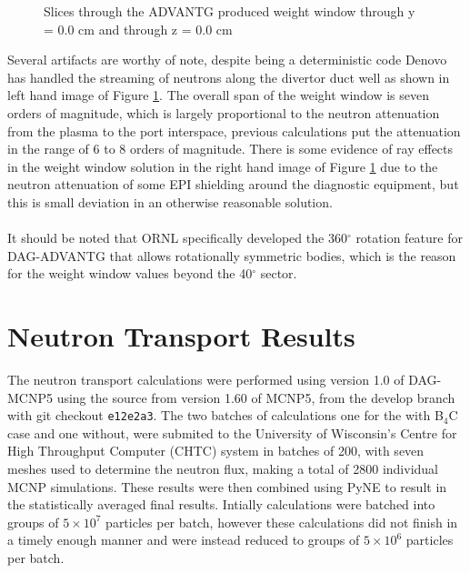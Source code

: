 \documentclass[12pt]{article}
\begin{document}
\begin{figure}[ht!]
  \caption{Slices through the ADVANTG produced weight window through y = 0.0 cm and through z = 0.0 cm}
  \label{fig:wwinp}
\end{figure}
Several artifacts are worthy of note, despite being a deterministic code Denovo has handled the streaming of neutrons along the divertor duct well as shown in left hand image of Figure \ref{fig:wwinp}. The overall span of the weight window is seven orders of magnitude, which is largely proportional to the neutron attenuation from the plasma to the port interspace, previous calculations put the attenuation in the range of 6 to 8 orders of magnitude. There is some evidence of ray effects in the weight window solution in the right hand image of Figure \ref{fig:wwinp} due to the neutron attenuation of some EPI shielding around the diagnostic equipment, but this is small deviation in an otherwise reasonable solution.
\\
\\
It should be noted that ORNL specifically developed the 360$^{\circ}$ rotation feature for DAG-ADVANTG that allows rotationally symmetric bodies, which is the reason for the weight window values beyond the 40$^{\circ}$ sector. 

\section{Neutron Transport Results}
The neutron transport calculations were performed using version 1.0 of DAG-MCNP5 using the source from version 1.60 of MCNP5, from the develop branch with git checkout \texttt{e12e2a3}. The two batches of calculations one for the with B$_4$C case and one without, were submited to the University of Wisconsin's Centre for High Throughput Computer (CHTC) system in batches of 200, with seven meshes used to determine the neutron flux, making a total of 2800 individual MCNP simulations. These results were then combined using PyNE to result in the statistically averaged final results. Intially calculations were batched into groups of $5\times10^7$ particles per batch, however these calculations did not finish in a timely enough manner and were instead reduced to groups of $5\times10^6$ particles per batch. 
\end{document}
